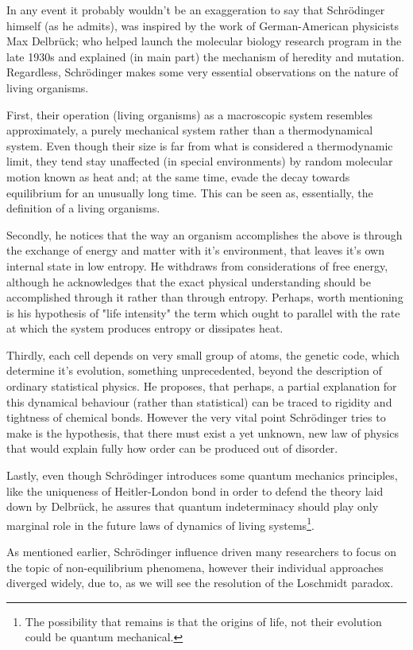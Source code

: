 \documentclass[a4paper,12pt]{article}
\begin{document}
In any event it probably wouldn't be an exaggeration to say that Schrödinger himself (as he admits), was inspired by the work of German-American physicists Max Delbrück; who helped launch the molecular biology research program in the late 1930s and explained (in main part) the mechanism of heredity and mutation.
Regardless, Schrödinger makes some very essential observations on the nature of living organisms.

First, their operation (living organisms) as a macroscopic system resembles approximately, a purely mechanical system rather than a thermodynamical system. 
Even though their size is far from what is considered a thermodynamic limit, they tend stay unaffected (in special environments) by random molecular motion known as heat and; at the same time, evade the decay towards equilibrium for an unusually long time. This can be seen as, essentially, the definition of a living organisms.

Secondly, he notices that the way an organism accomplishes the above is through the exchange of energy and matter with it's environment, that leaves it's own internal state in low entropy. He withdraws from considerations of free energy, although he acknowledges that the exact physical understanding should be accomplished through it rather than through entropy. Perhaps, worth mentioning is his hypothesis of "life intensity" the term which ought to parallel with the rate at which the system produces entropy or dissipates heat.

Thirdly, each cell depends on very small group of atoms, the genetic code, which determine it's evolution, something unprecedented, beyond the description of ordinary statistical physics. He proposes, that perhaps, a partial explanation for this dynamical behaviour (rather than statistical) can be traced to rigidity and tightness of chemical bonds. However the very vital point Schrödinger tries to make is the hypothesis, that there must exist a yet unknown, new law of physics that would explain fully how order can be produced out of disorder. 

Lastly, even though Schrödinger introduces some quantum mechanics principles, like the uniqueness of Heitler-London bond in order to defend the theory laid down by Delbrück, he assures that quantum indeterminacy should play only marginal role in the future laws of dynamics of living systems\footnote{The possibility that remains is that the origins of life, not their evolution could be quantum mechanical.}.

As mentioned earlier, Schrödinger influence driven many researchers to focus on the topic of non-equilibrium phenomena, however their individual approaches diverged widely, due to, as we will see the resolution of the Loschmidt paradox.
\end{document}
